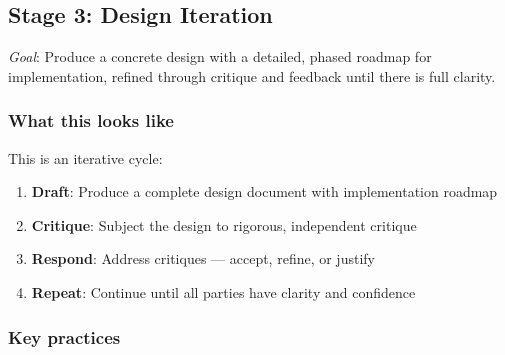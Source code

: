 \documentclass[11pt]{article}
\begin{document}
\subsection{Stage 3: Design Iteration}
\label{sec:org6ce9496}

\emph{Goal}: Produce a concrete design with a detailed, phased roadmap for
implementation, refined through critique and feedback until there is
full clarity.
\subsubsection{What this looks like}
\label{sec:org48d4af2}

This is an iterative cycle:

\begin{enumerate}
\item \textbf{Draft}: Produce a complete design document with implementation roadmap
\item \textbf{Critique}: Subject the design to rigorous, independent critique
\item \textbf{Respond}: Address critiques --- accept, refine, or justify
\item \textbf{Repeat}: Continue until all parties have clarity and confidence
\end{enumerate}
\subsubsection{Key practices}
\label{sec:orgb15116b}
\end{document}

